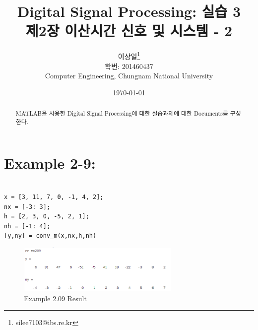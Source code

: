 \documentclass[11pt
  , a4paper
  , article
  , oneside
]{memoir}
\begin{document}
\newcommand{\technumber}{
  Digital Signal Processing using MATLAB\\
  Document 1: 2016-03-26}
\title{\textbf{Digital Signal Processing: 실습 3 \\
		제2장 이산시간 신호 및 시스템 - 2 \\}}

\author{이상일\thanks{silee7103@ibs.re.kr} \\

  학번: 201460437\\
  Computer Engineering, Chungnam National University 
}
\date{\today}

\renewcommand{\maketitlehooka}{\begin{flushright}\textsf{\technumber}\end{flushright}}

\maketitle

\begin{abstract}
MATLAB을 사용한 Digital Signal Processing에 대한 실습과제에 대한 Documents를 구성한다.
\end{abstract}

\chapter{Example 2-9:}

\begin{lstlisting}[style=termstyle]
% Example 2.9

x = [3, 11, 7, 0, -1, 4, 2];
nx = [-3: 3];
h = [2, 3, 0, -5, 2, 1];
nh = [-1: 4];
[y,ny] = conv_m(x,nx,h,nh)
\end{lstlisting}

\begin{figure}[h!]
	\centering
	\includegraphics[width=0.7\textwidth,height=0.2\textwidth]{./images/ex209.png}
	\caption{Example 2.09 Result}
	\label{fig:Example 2.09 Result}
\end{figure}
\end{document}
